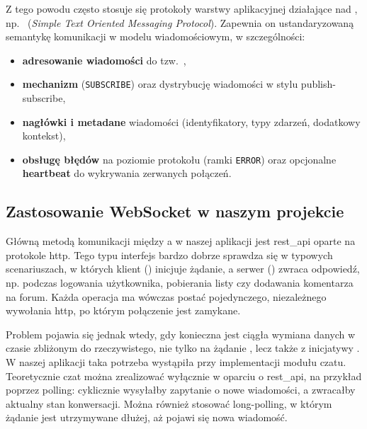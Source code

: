 Z tego powodu często stosuje się protokoły warstwy aplikacyjnej działające nad
, np.\  (\emph{Simple Text Oriented Messaging Protocol}).
Zapewnia on ustandaryzowaną semantykę komunikacji w modelu wiadomościowym, w szczególności:
\begin{itemize}
    \item \textbf{adresowanie wiadomości} do tzw.\ ,
    \item \textbf{mechanizm } (\texttt{SUBSCRIBE}) oraz dystrybucję wiadomości
    w stylu \gls{publish-subscribe},
    \item \textbf{nagłówki i metadane} wiadomości (identyfikatory, typy zdarzeń, dodatkowy kontekst),
    \item \textbf{obsługę błędów} na poziomie protokołu (ramki \texttt{ERROR}) oraz opcjonalne \textbf{heartbeat}
    do wykrywania zerwanych połączeń.
\end{itemize}

\subsection{Zastosowanie WebSocket w naszym projekcie}
\label{subsec:zastosowanie-w-naszym-przypadku}

Główną metodą komunikacji między  a  w naszej aplikacji
jest \gls{rest_api} oparte na protokole \gls{http}.
Tego typu interfejs bardzo dobrze sprawdza się w typowych scenariuszach, w których \gls{klient}
() inicjuje żądanie, a \gls{serwer} () zwraca odpowiedź,
np. podczas logowania użytkownika, pobierania listy  czy dodawania komentarza na forum.
Każda operacja ma wówczas postać pojedynczego, niezależnego wywołania \gls{http}, po którym połączenie jest zamykane.

Problem pojawia się jednak wtedy, gdy konieczna jest ciągła wymiana danych w czasie zbliżonym do rzeczywistego, nie tylko na żądanie , lecz także z inicjatywy .
W naszej aplikacji taka potrzeba wystąpiła przy implementacji modułu czatu.
Teoretycznie czat można zrealizować wyłącznie w oparciu o \gls{rest_api}, na przykład poprzez \gls{polling}:
 cyklicznie wysyłałby zapytanie o nowe wiadomości, a  zwracałby
aktualny stan konwersacji. Można również stosować \gls{long-polling}, w którym żądanie jest utrzymywane dłużej,
aż pojawi się nowa wiadomość.

